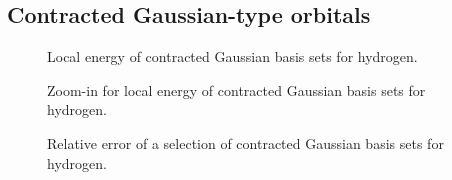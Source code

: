 \subsection{Contracted Gaussian-type orbitals}
\label{sec:cGTO}


\begin{figure}
	\centering
	\caption{Local energy of contracted Gaussian basis sets for hydrogen.}
	\label{fig:LocalEnergyCgto}
\end{figure}

\begin{figure}
	\centering
	\caption{Zoom-in for local energy of contracted Gaussian basis sets for hydrogen.}
	\label{fig:LocalEnergyCgtoZoom}
\end{figure}

\begin{figure}
	\centering
	\caption{Relative error of a selection of contracted Gaussian basis sets
		for hydrogen.}
	\label{fig:LocalEnergyCgto}
\end{figure}


